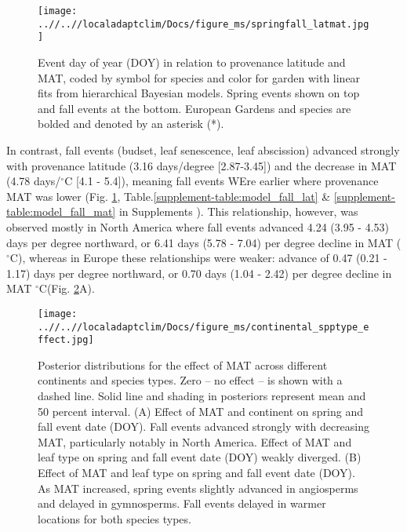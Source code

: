 \documentclass{article}
\begin{document}
\begin{figure}[!h] 
    \centering
 \texttt{[image: ..//..//localadaptclim/Docs/figure\_ms/springfall\_latmat.jpg]}
    \caption{Event day of year (DOY) in relation to provenance latitude and MAT, coded by symbol for species and color for garden with linear fits from hierarchical Bayesian models. Spring events shown on top and fall events at the bottom. European Gardens and species are bolded and denoted by an asterisk (*). } 
    \label{figure:springfall_latmat}
\end{figure}


In contrast, fall events (budset, leaf senescence, leaf abscission) advanced strongly with provenance latitude (3.16 days/degree [2.87-3.45]) and the decrease in MAT (4.78 days/$^{\circ}$C [4.1 - 5.4]), meaning fall events WEre earlier where provenance MAT was lower (Fig. \ref{figure:springfall_latmat}, Table.\ref{supplement-table:model_fall_lat} \& \ref{supplement-table:model_fall_mat} in Supplements ). This relationship, however, was observed mostly in North America where fall events advanced 4.24 (3.95 - 4.53) days per degree northward, or 6.41 days (5.78 - 7.04) per degree decline in MAT ($^{\circ}$C), whereas in Europe these relationships were weaker: advance of 0.47 (0.21 - 1.17) days per degree northward, or 0.70 days (1.04 - 2.42) per degree decline in MAT $^{\circ}$C(Fig. \ref{figure:continental_spptype_effect}A).

\begin{figure}[!h] 
    \centering
 \texttt{[image: ..//..//localadaptclim/Docs/figure\_ms/continental\_spptype\_effect.jpg]}
    \caption{Posterior distributions for the effect of MAT across different continents and species types. Zero -- no effect -- is shown with a dashed line. Solid line and shading in posteriors represent mean and 50 percent interval. (A) Effect of MAT and continent on spring and fall event date (DOY). Fall events advanced strongly with decreasing MAT, particularly notably in North America. Effect of MAT and leaf type on spring and fall event date (DOY) weakly diverged. (B) Effect of MAT and leaf type on spring and fall event date (DOY). As MAT increased, spring events slightly advanced in angiosperms and delayed in gymnosperms. Fall events delayed in warmer locations for both species types.}
    \label{figure:continental_spptype_effect}
\end{figure}
\end{document}
